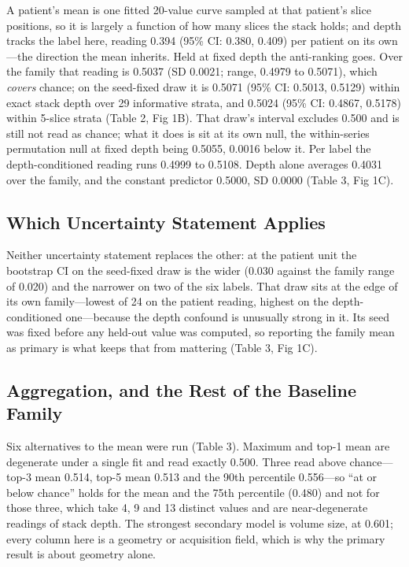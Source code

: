 \documentclass[11pt,letterpaper]{article}
\begin{document}
A patient's mean is one fitted 20-value curve sampled at that patient's slice
positions, so it is largely a function of how many slices the stack holds; and
depth tracks the label here, reading 0.394 (95\% CI: 0.380, 0.409) per patient on
its own---the direction the mean inherits. Held at fixed depth the anti-ranking
goes. Over the family that reading is 0.5037 (SD 0.0021; range, 0.4979 to
0.5071), which \emph{covers} chance; on the seed-fixed draw it is
0.5071 (95\% CI: 0.5013, 0.5129) within exact stack depth over 29 informative
strata, and 0.5024 (95\% CI: 0.4867, 0.5178) within 5-slice strata (Table 2,
Fig 1B). That draw's interval excludes 0.500 and is still not read as chance;
what it does is sit at its own null, the within-series permutation null at fixed
depth being 0.5055, 0.0016 below it. Per label the depth-conditioned reading runs
0.4999 to 0.5108. Depth alone averages 0.4031 over the family, and the constant
predictor 0.5000, SD 0.0000 (Table 3, Fig 1C).

\subsection*{Which Uncertainty Statement Applies}

Neither uncertainty statement replaces the other: at the patient unit the
bootstrap CI on the seed-fixed draw is the wider (0.030 against the family
range of 0.020) and the narrower on two of the six labels. That draw sits at the
edge of its own family---lowest of 24 on the patient reading, highest on the
depth-conditioned one---because the depth confound is unusually strong in it. Its
seed was fixed before any held-out value was computed, so reporting the family
mean as primary is what keeps that from mattering (Table 3, Fig 1C).

\subsection*{Aggregation, and the Rest of the Baseline Family}

Six alternatives to the mean were run (Table 3). Maximum and top-1 mean are
degenerate under a single fit and read exactly 0.500. Three read
above chance---top-3 mean 0.514, top-5 mean 0.513 and the 90th percentile
0.556---so ``at or below chance'' holds for the mean and the 75th percentile
(0.480) and not for those three, which take 4, 9 and 13 distinct values and are
near-degenerate readings of stack depth. The strongest secondary model is volume
size, at 0.601; every column here is a geometry or acquisition field, which is
why the primary result is about geometry alone.
\end{document}
